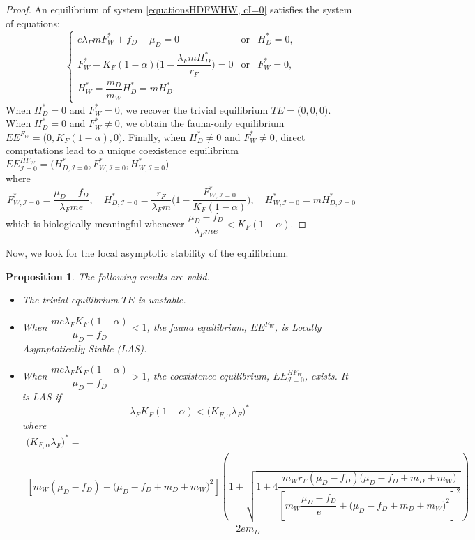 \documentclass{article}
\newcommand{\lfw}{\lambda_{F}}
\newcommand{\lfw}{\lambda_{F}}
\newcommand{\Kfa}{K_{F,\alpha}}
\newcommand{\cI}{\mathcal{I}}
\newtheorem{prop}{Proposition}
\begin{document}
\begin{proof}
An equilibrium of system \eqref{equationsHDFWHW, cI=0} satisfies the system of equations:
\begin{equation}\label{system-equilibre, cI=0}
\left\lbrace \begin{array}{cll}
 e \lfw m F_W^* + f_D - \mu_D = 0& \mbox{or} & H_D^* = 0,\\
F_W^* - K_F(1-\alpha) \Big(1 - \dfrac{\lfw m H^*_D}{r_F} \Big) = 0& \mbox{or} & F^*_W = 0,\\
H_W^* = \dfrac{m_D}{m_W} H_D^* = m H_D^*.&&
\end{array} \right.
\end{equation}
When $H_D^*=0$ and $F_W^*=0$, we recover the trivial equilibrium $TE = \Big(0,0,0\Big)$. When $H_D^*=0$ and $F_W^*\neq0$, we obtain the fauna-only equilibrium $EE^{F_W} = \Big(0, K_F(1-\alpha), 0 \Big)$. Finally, when $H_D^*\neq0$ and $F_W^*\neq0$, direct computations lead to a unique coexistence equilibrium 
$EE^{HF_W}_{\cI = 0} = \Big(H^*_{D, \cI = 0}, F^*_{W, \cI = 0}, H^*_{W, \cI = 0} \Big)$ \\ 
where 
$$
F^*_{W, \cI = 0} = \dfrac{\mu_D - f_D}{\lfw m e},
\quad
H^*_{D, \cI = 0} = \dfrac{r_F}{\lfw m} \Big(1 - \dfrac{F^*_{W, \cI = 0}}{K_F(1-\alpha)} \Big),
\quad
H^*_{W, \cI = 0} = m H^*_{D, \cI = 0}
$$
which is biologically meaningful whenever $\dfrac{\mu_D - f_D}{\lfw m e} < K_F(1-\alpha).$
\end{proof}

Now, we look for the local asymptotic stability of the equilibrium.

\begin{prop}\label{propLAS, cI=0} The following results are valid.
\begin{itemize}
\item The trivial equilibrium $TE$ is unstable.
\item When $\dfrac{m e \lfw K_F(1-\alpha)}{\mu_D - f_D} < 1$, the fauna equilibrium, $EE^{F_W}$, is Locally Asymptotically Stable (LAS).
\item When $\dfrac{m e \lfw K_F(1-\alpha)}{\mu_D - f_D} > 1$, the coexistence equilibrium, $EE^{HF_W}_{\cI =0}$, exists. It is LAS if 
$$
\lfw K_F(1-\alpha) < \Big(\Kfa \lfw \Big)^*
$$
where \begin{multline*}
\Big(\Kfa \lfw \Big)^* = \\
 \dfrac{\left[m_{W}(\mu_{D}-f_{D})+\big(\mu_{D}-f_{D}+m_{D}+m_{W})^{2}\right]\left(1+\sqrt{1+4\dfrac{m_{W}r_{F}\left(\mu_{D}-f_{D}\right)\big(\mu_{D}-f_{D}+m_{D}+m_{W})}{\left[m_{W}\dfrac{\mu_{D}-f_{D}}{e}+\big(\mu_{D}-f_{D}+m_{D}+m_{W})^{2}\right]^{2}}}\right)}{2em_D}
\end{multline*}
\end{itemize}
\end{prop}
\end{document}
